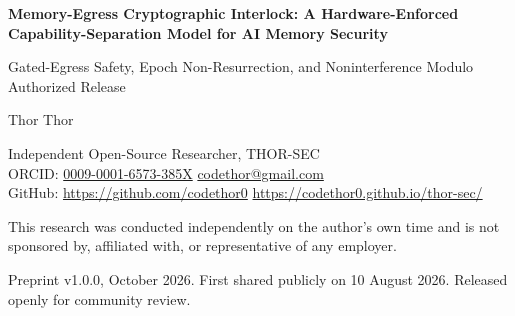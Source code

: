 \documentclass[11pt,letterpaper]{article}
\newcommand{\authorname}{Thor Thor}
\newcommand{\orcidid}{0009-0001-6573-385X}
\theoremstyle{plain}
\theoremstyle{definition}
\begin{document}
\begin{center}
{\LARGE\bfseries Memory-Egress Cryptographic Interlock: A Hardware-Enforced Capability-Separation Model for AI Memory Security\par}
\vspace{0.6em}
{\large Gated-Egress Safety, Epoch Non-Resurrection, and Noninterference Modulo Authorized Release\par}
\vspace{1.0em}
{\large \authorname\par}
\vspace{0.3em}
{\small Independent Open-Source Researcher, THOR-SEC\\
ORCID: \href{https://orcid.org/\orcidid}{\orcidid} \quad \url{codethor@gmail.com}\\
GitHub: \url{https://github.com/codethor0} \quad \url{https://codethor0.github.io/thor-sec/}\par}
\vspace{0.3em}
{\small This research was conducted independently on the author's own time and is not sponsored by, affiliated with, or representative of any employer.\par}
\vspace{0.3em}
{\small Preprint v1.0.0, October 2026. First shared publicly on 10 August 2026. Released openly for community review.\par}
\end{center}
\end{document}
